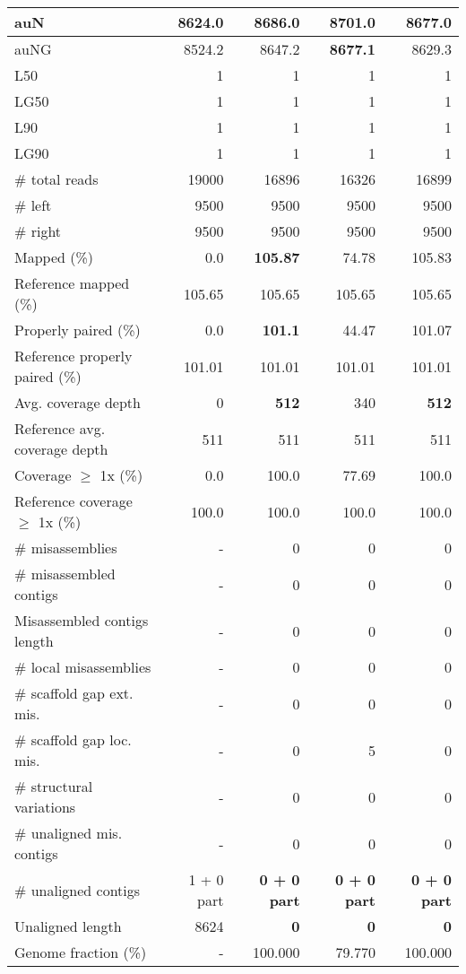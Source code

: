 \documentclass[12pt,a4paper]{article}
\begin{document}
\begin{table}[ht]
\begin{center}
\begin{tabular}{|l*{4}{|r}|}
auN & 8624.0 & 8686.0 & {\bf 8701.0} & 8677.0 \\ \hline
auNG & 8524.2 & 8647.2 & {\bf 8677.1} & 8629.3 \\ \hline
L50 & 1 & 1 & 1 & 1 \\ \hline
LG50 & 1 & 1 & 1 & 1 \\ \hline
L90 & 1 & 1 & 1 & 1 \\ \hline
LG90 & 1 & 1 & 1 & 1 \\ \hline
\# total reads & 19000 & 16896 & 16326 & 16899 \\ \hline
\# left & 9500 & 9500 & 9500 & 9500 \\ \hline
\# right & 9500 & 9500 & 9500 & 9500 \\ \hline
Mapped (\%) & 0.0 & {\bf 105.87} & 74.78 & 105.83 \\ \hline
Reference mapped (\%) & 105.65 & 105.65 & 105.65 & 105.65 \\ \hline
Properly paired (\%) & 0.0 & {\bf 101.1} & 44.47 & 101.07 \\ \hline
Reference properly paired (\%) & 101.01 & 101.01 & 101.01 & 101.01 \\ \hline
Avg. coverage depth & 0 & {\bf 512} & 340 & {\bf 512} \\ \hline
Reference avg. coverage depth & 511 & 511 & 511 & 511 \\ \hline
Coverage $\geq$ 1x (\%) & 0.0 & 100.0 & 77.69 & 100.0 \\ \hline
Reference coverage $\geq$ 1x (\%) & 100.0 & 100.0 & 100.0 & 100.0 \\ \hline
\# misassemblies & - & 0 & 0 & 0 \\ \hline
\# misassembled contigs & - & 0 & 0 & 0 \\ \hline
Misassembled contigs length & - & 0 & 0 & 0 \\ \hline
\# local misassemblies & - & 0 & 0 & 0 \\ \hline
\# scaffold gap ext. mis. & - & 0 & 0 & 0 \\ \hline
\# scaffold gap loc. mis. & - & 0 & 5 & 0 \\ \hline
\# structural variations & - & 0 & 0 & 0 \\ \hline
\# unaligned mis. contigs & - & 0 & 0 & 0 \\ \hline
\# unaligned contigs & 1 + 0 part & {\bf 0 + 0 part} & {\bf 0 + 0 part} & {\bf 0 + 0 part} \\ \hline
Unaligned length & 8624 & {\bf 0} & {\bf 0} & {\bf 0} \\ \hline
Genome fraction (\%) & - & 100.000 & 79.770 & 100.000 \\ \hline

\end{tabular}
\end{center}
\end{table}
\end{document}
